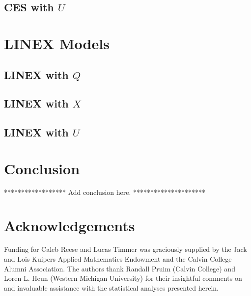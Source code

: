 \documentclass[preprint,authoryear,12pt]{elsarticle}\usepackage{graphicx, color}
\begin{document}
\subsection{CES with $U$}

\section{LINEX Models}

\subsection{LINEX with $Q$}

\subsection{LINEX with $X$}

\subsection{LINEX with $U$}

\section{Conclusion}

****************** Add conclusion here. *********************

\section*{Acknowledgements}

Funding for Caleb Reese and Lucas Timmer was graciously supplied by the Jack and Lois Kuipers Applied Mathematics Endowment and the Calvin College Alumni Association. The authors thank Randall Pruim (Calvin College) and Loren L. Heun (Western Michigan University) for their insightful comments on and invaluable assistance with the statistical analyses presented herein.

\end{document}
